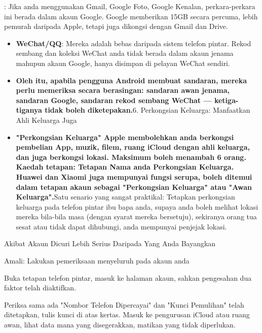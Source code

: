 
: Jika anda menggunakan Gmail, Google Foto, Google Kenalan, perkara-perkara ini berada dalam akaun Google. Google memberikan 15GB secara percuma, lebih pemurah daripada Apple, tetapi juga dikongsi dengan Gmail dan Drive.

\begin{itemize}
  \item \textbf{WeChat/QQ}: Mereka adalah bebas daripada sistem telefon pintar. Rekod sembang dan koleksi WeChat anda tidak berada dalam akaun jenama mahupun akaun Google, hanya disimpan di pelayan WeChat sendiri.
  \item \textbf{Oleh itu, apabila pengguna Android membuat sandaran, mereka perlu memeriksa secara berasingan: sandaran awan jenama, sandaran Google, sandaran rekod sembang WeChat — ketiga-tiganya tidak boleh diketepakan.}6. Perkongsian Keluarga: Manfaatkan Ahli Keluarga Juga
  \item \textbf{"Perkongsian Keluarga" Apple membolehkan anda berkongsi pembelian App, muzik, filem, ruang iCloud dengan ahli keluarga, dan juga berkongsi lokasi. Maksimum boleh menambah 6 orang. Kaedah tetapan: Tetapan Nama anda Perkongsian Keluarga. Huawei dan Xiaomi juga mempunyai fungsi serupa, boleh ditemui dalam tetapan akaun sebagai "Perkongsian Keluarga" atau "Awan Keluarga".}Satu senario yang sangat praktikal: Tetapkan perkongsian keluarga pada telefon pintar ibu bapa anda, supaya anda boleh melihat lokasi mereka bila-bila masa (dengan syarat mereka bersetuju), sekiranya orang tua sesat atau tidak dapat dihubungi, anda mempunyai penjejak lokasi.
\end{itemize}

Akibat Akaun Dicuri Lebih Serius Daripada Yang Anda Bayangkan


Amali: Lakukan pemeriksaan menyeluruh pada akaun anda

Buka tetapan telefon pintar, masuk ke halaman akaun, sahkan pengesahan dua faktor telah diaktifkan.

\begin{tcbwarn}{Periksa sama ada "Nombor Telefon Dipercayai" dan "Kunci Pemulihan" telah ditetapkan, tulis kunci di atas kertas.}
Masuk ke pengurusan iCloud atau ruang awan, lihat data mana yang disegerakkan, matikan yang tidak diperlukan.

\end{tcbwarn}

